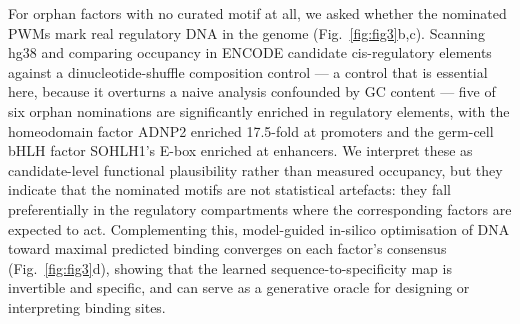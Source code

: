 \documentclass[11pt,letterpaper]{article}
\begin{document}
For orphan factors with no curated motif at all, we asked whether the nominated PWMs mark real
regulatory DNA in the genome (Fig.~\ref{fig:fig3}b,c). Scanning hg38 and comparing occupancy in
ENCODE candidate cis-regulatory elements against a dinucleotide-shuffle composition control --- a
control that is essential here, because it overturns a naive analysis confounded by GC content ---
five of six orphan nominations are significantly enriched in regulatory elements, with the
homeodomain factor ADNP2 enriched 17.5-fold at promoters and the germ-cell bHLH factor SOHLH1's
E-box enriched at enhancers. We interpret these as candidate-level functional plausibility rather
than measured occupancy, but they indicate that the nominated motifs are not statistical artefacts:
they fall preferentially in the regulatory compartments where the corresponding factors are
expected to act. Complementing this, model-guided in-silico optimisation of DNA toward maximal
predicted binding converges on each factor's consensus (Fig.~\ref{fig:fig3}d), showing that the
learned sequence-to-specificity map is invertible and specific, and can serve as a generative
oracle for designing or interpreting binding sites.
\end{document}
